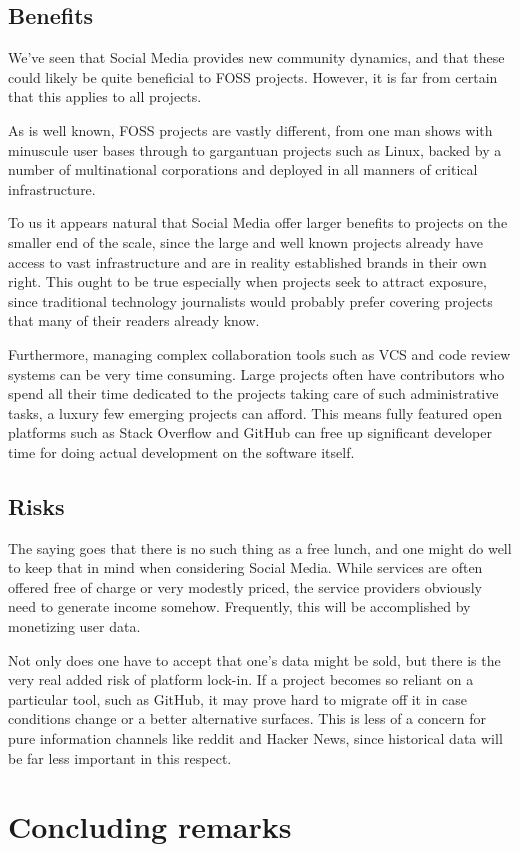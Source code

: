 \documentclass[a4paper,11pt]{article} %
\begin{document}
\subsection{Benefits}

We've seen that Social Media provides new community dynamics, and that
these could likely be quite beneficial to FOSS projects. However, it
is far from certain that this applies to all projects.

As is well known, FOSS projects are vastly different, from one man
shows with minuscule user bases through to gargantuan projects such as
Linux, backed by a number of multinational corporations and deployed
in all manners of critical infrastructure.

To us it appears natural that Social Media offer larger benefits to
projects on the smaller end of the scale, since the large and well
known projects already have access to vast infrastructure and are in
reality established brands in their own right. This ought to be true
especially when projects seek to attract exposure, since traditional
technology journalists would probably prefer covering projects that
many of their readers already know.

Furthermore, managing complex collaboration tools such as VCS and code
review systems can be very time consuming. Large projects often have
contributors who spend all their time dedicated to the projects taking
care of such administrative tasks, a luxury few emerging projects can
afford. This means fully featured open platforms such as Stack
Overflow and GitHub can free up significant developer time for doing
actual development on the software itself.

\subsection{Risks}

The saying goes that there is no such thing as a free lunch, and one
might do well to keep that in mind when considering Social
Media. While services are often offered free of charge or very
modestly priced, the service providers obviously need to generate
income somehow. Frequently, this will be accomplished by monetizing
user data.

Not only does one have to accept that one's data might be sold, but
there is the very real added risk of platform lock-in. If a project
becomes so reliant on a particular tool, such as GitHub, it may prove
hard to migrate off it in case conditions change or a better
alternative surfaces. This is less of a concern for pure information
channels like reddit and Hacker News, since historical data will be
far less important in this respect.

\section{Concluding remarks}



\newpage
\printbibliography
\end{document}
